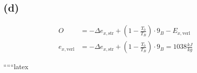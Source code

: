 

\subsection*{(d)}

\begin{align*}
    O &= -\Delta e_{x, \text{str}} + \left( 1 - \frac{T_0}{T_B} \right) \cdot 9_B - E_{x, \text{verl}} \\
    e_{x, \text{verl}} &= -\Delta e_{x, \text{str}} + \left( 1 - \frac{T_0}{T_B} \right) \cdot 9_B = 1038 \frac{kJ}{kg}
\end{align*}

``````latex